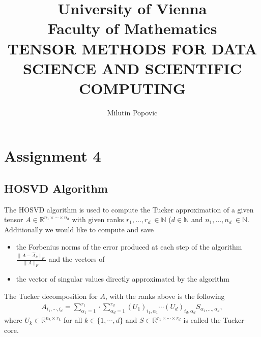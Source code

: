 \documentclass[a4paper]{article}
\title{University of Vienna\\ Faculty of Mathematics\\
\vspace{1cm}TENSOR METHODS FOR DATA SCIENCE AND SCIENTIFIC COMPUTING
}
\author{Milutin Popovic}
\begin{document}
\maketitle
\tableofcontents
\section{Assignment 4}
\subsection{HOSVD Algorithm}
The HOSVD algorithm is used to compute the Tucker approximation of a given tensor $A \in \mathbb{R}^{n_1
\times \cdots \times n_d}$ with given ranks $r_1, \dots, r_d\ \in \mathbb{N}$ ($d
\in \mathbb{N}$ and $n_1, \dots, n_d\ \in \mathbb{N}$. Additionally we would
like to compute and save
\begin{itemize}
    \item  the Forbenius norms of the error produced at each step of the
            algorithm $\frac{\| A - \hat{A}_k\|_F}{\|A\|_F}$ and the vectors of
    \item the vector of singular values directly approximated by the
        algorithm
\end{itemize}
The Tucker decomposition for $A$, with the ranks above is the following
\begin{align}
    A_{i_1,\cdots,i_d} = \sum_{\alpha_1=1}^{r_1} \cdot
    \sum_{\alpha_d=1}^{r_d} (U_1)_{i_1,\alpha_1} \cdots (U_d)_{i_d,\alpha_d}
    S_{\alpha_1, \dots, \alpha_d},
\end{align}
where $U_k \in \mathbb{R}^{n_k \times r_k}$ for all $k \in \{1, \cdots, d\}$
and $S \in \mathbb{R}^{r_1 \times \cdots \times r_d}$ is called the
Tucker-core.
\end{document}
